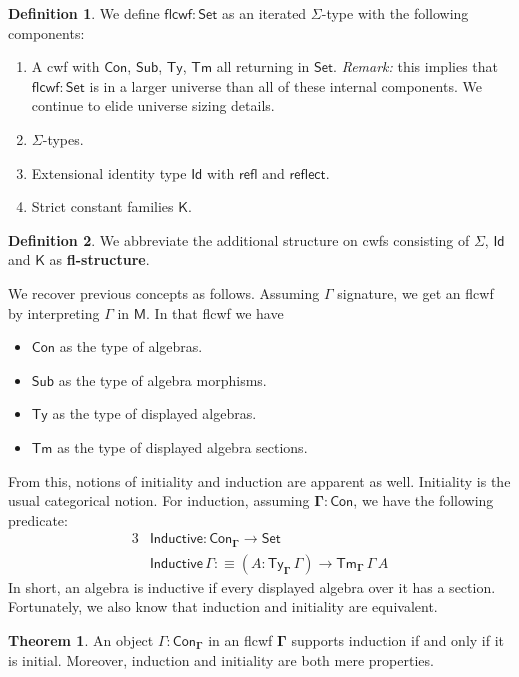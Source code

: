 \documentclass[12pt,a4paper,twoside,openany]{book}
\theoremstyle{remark}
\theoremstyle{definition}
\newtheorem{mydefinition}{Definition}
\theoremstyle{theorem}
\newtheorem{theorem}{Theorem}
\newcommand{\ms}[1]{\mathsf{#1}}
\newcommand{\bs}[1]{\boldsymbol{#1}}
\newcommand{\refl}{\mathsf{refl}}
\newcommand{\reflect}{\mathsf{reflect}}
\newcommand{\Con}{\mathsf{Con}}
\newcommand{\Sub}{\mathsf{Sub}}
\newcommand{\Tm}{\mathsf{Tm}}
\newcommand{\Ty}{\mathsf{Ty}}
\newcommand{\Id}{\mathsf{Id}}
\newcommand{\ra}{\rightarrow}
\newcommand{\Set}{\mathsf{Set}}
\newcommand{\flcwf}{\mathsf{flcwf}}
\newcommand{\K}{\mathsf{K}}
\newcommand{\bCon}{\bs{\Con}}
\newcommand{\bGamma}{\bs{\Gamma}}
\newcommand{\bM}{\bs{\mathsf{M}}}
\newcommand{\Inductive}{\ms{Inductive}}
\newcommand{\defn}{:\equiv}
\begin{document}
\begin{mydefinition}\label{def:flcwf}
We define $\flcwf : \Set$ as an iterated $\Sigma$-type with the following components:
\begin{enumerate}
  \item A cwf with $\Con$, $\Sub$, $\Ty$, $\Tm$ all returning in $\Set$. \emph{Remark:}
        this implies that $\flcwf : \Set$ is in a larger universe than all of these
        internal components. We continue to elide universe sizing details.
  \item $\Sigma$-types.
  \item Extensional identity type $\Id$ with $\refl$ and $\reflect$.
  \item Strict constant families $\K$.
\end{enumerate}
\end{mydefinition}
\begin{mydefinition}
We abbreviate the additional structure on cwfs consisting of $\Sigma$, $\Id$ and
$\K$ as \textbf{fl-structure}.
\end{mydefinition}

We recover previous concepts as follows. Assuming $\Gamma$ signature, we get an
flcwf by interpreting $\Gamma$ in $\bM$. In that flcwf we have
\begin{itemize}
  \item $\Con$ as the type of algebras.
  \item $\Sub$ as the type of algebra morphisms.
  \item $\Ty$ as the type of displayed algebras.
  \item $\Tm$ as the type of displayed algebra sections.
\end{itemize}
From this, notions of initiality and induction are apparent as well. Initiality
is the usual categorical notion. For induction, assuming $\bGamma : \bCon$, we
have the following predicate:
\begin{alignat*}{3}
  & \Inductive : \Con_{\bGamma} \to \Set\\
  & \Inductive\,\Gamma \defn (A : \Ty_{\bGamma}\,\Gamma)\ra \Tm_{\bGamma}\,\Gamma\,A
\end{alignat*}
In short, an algebra is inductive if every displayed algebra over it has a
section. Fortunately, we also know that induction and initiality are
equivalent.

\begin{theorem}\label{thm:initiality-induction}
An object $\Gamma : \Con_{\bGamma}$ in an flcwf $\bGamma$ supports induction if
and only if it is initial. Moreover, induction and initiality are both mere
properties.
\end{theorem}
\end{document}
